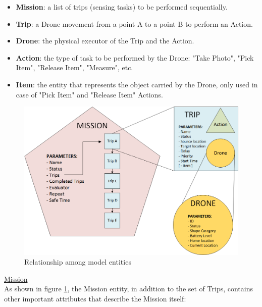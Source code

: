 \begin{itemize}
\itemsep2pt
\item{
\textbf{Mission}: a list of trips (sensing tasks) to be performed sequentially.
}
\item{
\textbf{Trip}: a Drone movement from a point A to a point B to perform an Action.
}
\item{
\textbf{Drone}: the physical executor of the Trip and the Action.
}
\item{
\textbf{Action}: the type of task to be performed by the Drone: "Take Photo", "Pick Item", "Release Item", "Measure", etc.
}
\item{
\textbf{Item}: the entity that represents the object carried by the Drone, only used in case of "Pick Item" and "Release Item" Actions.
}
\end{itemize}

\begin{figure}[htb]
  \centering
  \includegraphics[width=\linewidth]
  {pictures/EntityRelationship.png}
  \caption{Relationship among model entities}
  \label{fig:EntityRelationship}
\end{figure}

\newpage

\underline{Mission}
\\

As shown in figure \ref{fig:EntityRelationship}, the Mission entity, in addition to the set of Trips, contains other important attributes that describe the Mission itself:

